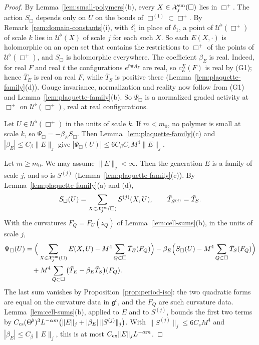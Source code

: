 \begin{proof}
By Lemma~\ref{lem:small-polymers}(b), every $X\in\mathcal X^{\rm sm}_j(\Box)$ lies in $\Box^+$. The action $S_\Box$ depends only on $U$ on the bonds of $\Box^{(1)}\subset\Box^+$. By Remark~\ref{rem:domain-constants}(i), with $\delta_1^\flat$ in place of $\delta_1$, a point of $\mathcal U^\flat(\Box^+)$ of scale $k$ lies in $\mathcal U^\flat(X)$ of scale $j$ for each such $X$. So each $E(X,\cdot)$ is holomorphic on an open set that contains the restrictions to $\Box^+$ of the points of $\mathcal U^\flat(\Box^+)$, and $S_\Box$ is holomorphic everywhere. The coefficient $\beta_E$ is real. Indeed, for real $F$ and real $t$ the configurations $e^{\ii\eta tA_F}$ are real, so $c^X_E(F)$ is real by (G1); hence $\bar T_E$ is real on real $F$, while $\bar T_S$ is positive there (Lemma~\ref{lem:plaquette-family}(d)). Gauge invariance, normalization and reality now follow from (G1) and Lemma~\ref{lem:plaquette-family}(b). So $\Psi_\Box$ is a normalized graded activity at $\Box^+$ on $\mathcal U^\flat(\Box^+)$, real at real configurations.

Let $U\in\mathcal U^\flat(\Box^+)$ in the units of scale $k$. If $m<m_0$, no polymer is small at scale $k$, so $\Psi_\Box=-\beta_ES_\Box$. Then Lemma~\ref{lem:plaquette-family}(c) and $|\beta_E|\le C_\beta\|E\|_j$ give $|\Psi_\Box(U)|\le6C_\beta C_sM^4\|E\|_j$.

Let $m\ge m_0$. We may assume $\|E\|_j<\infty$. Then the generation $E$ is a family of scale $j$, and so is $S^{(j)}$ (Lemma~\ref{lem:plaquette-family}(c)). By Lemma~\ref{lem:plaquette-family}(a) and (d),
\[
S_\Box(U)=\sum_{X\in\mathcal X^{\rm sm}_j(\Box)}S^{(j)}(X,U),\qquad\bar T_{S^{(j)}}=\bar T_S .
\]
With the curvatures $F_Q=F_U(z_Q)$ of Lemma~\ref{lem:cell-sums}(b), in the units of scale $j$,
\[
\begin{aligned}
\Psi_\Box(U)&=\Big(\sum_{X\in\mathcal X^{\rm sm}_j(\Box)}E(X,U)-M^4\sum_{Q\subset\Box}\bar T_E(F_Q)\Big)-\beta_E\Big(S_\Box(U)-M^4\sum_{Q\subset\Box}\bar T_S(F_Q)\Big)\\
&\quad+M^4\sum_{Q\subset\Box}\big(\bar T_E-\beta_E\bar T_S\big)(F_Q).
\end{aligned}
\]
The last sum vanishes by Proposition~\ref{prop:period-iso}: the two quadratic forms are equal on the curvature data in $\mathfrak g^c$, and the $F_Q$ are such curvature data. Lemma~\ref{lem:cell-sums}(b), applied to $E$ and to $S^{(j)}$, bounds the first two terms by $C_{\rm cs}(\Theta^\flat)^3L^{-\alpha m}\big(\|E\|_j+|\beta_E|\,\|S^{(j)}\|_j\big)$. With $\|S^{(j)}\|_j\le6C_sM^4$ and $|\beta_E|\le C_\beta\|E\|_j$, this is at most $C_{\rm ex}\|E\|_jL^{-\alpha m}$.
\end{proof}

